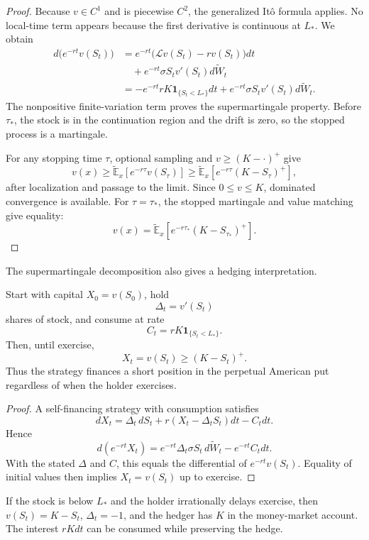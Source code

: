 \begin{proof}
Because $v\in C^1$ and is piecewise $C^2$, the generalized It\^o formula applies. No local-time term appears because the first derivative is continuous at $L_*$. We obtain
\[
\begin{aligned}
d\bigl(e^{-rt}v(S_t)\bigr)
&=e^{-rt}\bigl(\mathcal{L}v(S_t)-rv(S_t)\bigr)dt\\
&\quad+e^{-rt}\sigma S_tv'(S_t)d\widetilde W_t\\
&=-e^{-rt}rK\mathbf{1}_{\{S_t<L_*\}}dt
 +e^{-rt}\sigma S_tv'(S_t)d\widetilde W_t.
\end{aligned}
\]
The nonpositive finite-variation term proves the supermartingale property. Before $\tau_*$, the stock is in the continuation region and the drift is zero, so the stopped process is a martingale.

For any stopping time $\tau$, optional sampling and $v\geq(K-\cdot)^+$ give
\[
v(x)
\geq\widetilde{\mathbb{E}}_x
 \left[e^{-r\tau}v(S_\tau)\right]
\geq\widetilde{\mathbb{E}}_x
 \left[e^{-r\tau}(K-S_\tau)^+\right],
\]
after localization and passage to the limit. Since $0\leq v\leq K$, dominated convergence is available. For $\tau=\tau_*$, the stopped martingale and value matching give equality:
\[
v(x)
=\widetilde{\mathbb{E}}_x
 \left[e^{-r\tau_*}(K-S_{\tau_*})^+\right].
\]
\end{proof}

The supermartingale decomposition also gives a hedging interpretation.

\begin{cor}
Start with capital $X_0=v(S_0)$, hold
\[
\Delta_t=v'(S_t)
\]
shares of stock, and consume at rate
\[
C_t=rK\mathbf{1}_{\{S_t<L_*\}}.
\]
Then, until exercise,
\[
X_t=v(S_t)\geq(K-S_t)^+.
\]
Thus the strategy finances a short position in the perpetual American put regardless of when the holder exercises.
\end{cor}

\begin{proof}
A self-financing strategy with consumption satisfies
\[
dX_t=\Delta_t\,dS_t+r(X_t-\Delta_tS_t)dt-C_tdt.
\]
Hence
\[
d(e^{-rt}X_t)
=e^{-rt}\Delta_t\sigma S_t\,d\widetilde W_t-e^{-rt}C_tdt.
\]
With the stated $\Delta$ and $C$, this equals the differential of $e^{-rt}v(S_t)$. Equality of initial values then implies $X_t=v(S_t)$ up to exercise.
\end{proof}

If the stock is below $L_*$ and the holder irrationally delays exercise, then $v(S_t)=K-S_t$, $\Delta_t=-1$, and the hedger has $K$ in the money-market account. The interest $rKdt$ can be consumed while preserving the hedge.

